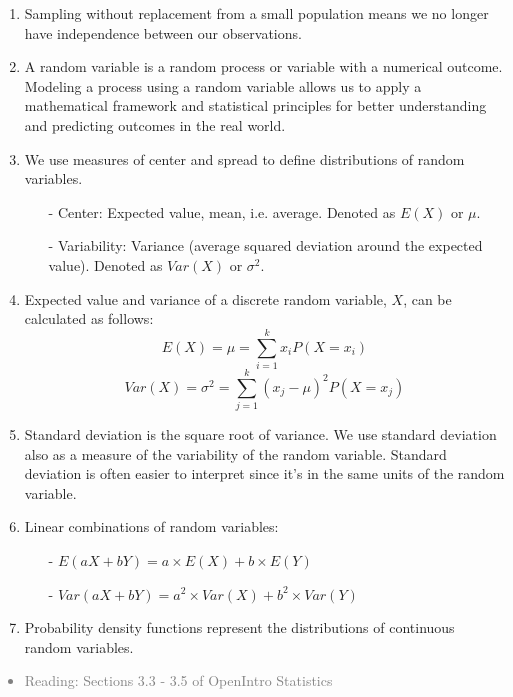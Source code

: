 \documentclass[11pt]{article}
\newcommand{\gray}[1]{\textcolor{gray}{#1}}
\begin{document}
%

\begin{enumerate}[resume]
\renewcommand\labelenumi{\textcolor{light}{\textbf{LO \theenumi.}}}

\item Sampling without replacement from a small population means we no longer have independence between our observations.

\item A random variable is a random process or variable with a numerical outcome. Modeling a process using a random variable allows us to apply a mathematical framework and statistical principles for better understanding and predicting outcomes in the real world.

\item We use measures of center and spread to define distributions of random variables.
\begin{itemize}
\item[-] Center: Expected value, mean, i.e. average. Denoted as $E(X)$ or $\mu$.
\item[-] Variability: Variance (average squared deviation around the expected value). Denoted as $Var(X)$ or $\sigma^2$.
\end{itemize}

\item Expected value and variance of a discrete random variable, $X$, can be calculated as follows:
\[ E(X) = \mu = \sum_{i = 1}^k x_i P(X = x_i) \]
\[ Var(X) = \sigma^2 = \sum_{j = 1}^k (x_j - \mu)^2 P(X = x_j) \]

\item Standard deviation is the square root of variance. We use standard deviation also as a measure of the variability of the random variable. Standard deviation is often easier to interpret since it's in the same units of the random variable.

\item Linear combinations of random variables:
\begin{itemize}
\item[-] $E(aX + bY) = a \times E(X) + b \times E(Y)$
\item[-] $Var(aX + bY) = a^2 \times Var(X) + b^2 \times Var(Y)$
\end{itemize}

\item Probability density functions represent the distributions of continuous random variables.

\end{enumerate}

\gray{
{\it
\vspace{-0.75cm}
\begin{itemize}
\renewcommand{\labelitemi}{{\textcolor{dark}{$\ast$}}}
\item Reading: Sections 3.3 - 3.5 of OpenIntro Statistics
\end{itemize}
}}
\end{document}
